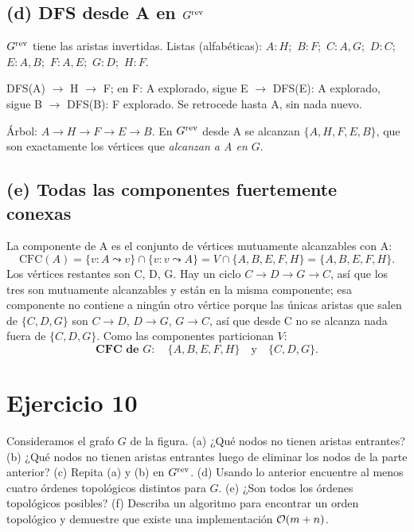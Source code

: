 \subsection*{(d) DFS desde A en $G^{\mathrm{rev}}$}
$G^{\mathrm{rev}}$ tiene las aristas invertidas. Listas (alfabéticas): $A\!:\!H$;\ $B\!:\!F$;\ $C\!:\!A,G$;\
$D\!:\!C$;\ $E\!:\!A,B$;\ $F\!:\!A,E$;\ $G\!:\!D$;\ $H\!:\!F$.

\textsc{DFS}(A) $\to$ H $\to$ F; en F: A explorado, sigue E $\to$ \textsc{DFS}(E): A explorado, sigue B
$\to$ \textsc{DFS}(B): F explorado. Se retrocede hasta A, sin nada nuevo.

Árbol: $A\to H\to F\to E\to B$. En $G^{\mathrm{rev}}$ desde A se alcanzan $\{A,H,F,E,B\}$, que son exactamente los
vértices que \emph{alcanzan a A en $G$}.

\subsection*{(e) Todas las componentes fuertemente conexas}
La componente de A es el conjunto de vértices mutuamente alcanzables con A:
\[ \mathrm{CFC}(A)=\{v: A\leadsto v\}\cap\{v: v\leadsto A\}
=V\cap\{A,B,E,F,H\}=\{A,B,E,F,H\}. \]
Los vértices restantes son C, D, G. Hay un ciclo $C\to D\to G\to C$, así que los tres son mutuamente
alcanzables y están en la misma componente; esa componente no contiene a ningún otro vértice porque
las únicas aristas que salen de $\{C,D,G\}$ son $C\to D$, $D\to G$, $G\to C$, así que desde C no se
alcanza nada fuera de $\{C,D,G\}$. Como las componentes particionan $V$:
\[ \textbf{CFC de } G:\quad \{A,B,E,F,H\}\quad\text{y}\quad\{C,D,G\}. \]

\section{Ejercicio 10}
\begin{enunciado}
Consideramos el grafo $G$ de la figura.
(a) ¿Qué nodos no tienen aristas entrantes?
(b) ¿Qué nodos no tienen aristas entrantes luego de eliminar los nodos de la parte anterior?
(c) Repita (a) y (b) en $G^{\mathrm{rev}}$.
(d) Usando lo anterior encuentre al menos cuatro órdenes topológicos distintos para $G$.
(e) ¿Son todos los órdenes topológicos posibles?
(f) Describa un algoritmo para encontrar un orden topológico y demuestre que existe una
implementación $\mathcal{O}(m+n)$.
\end{enunciado}

